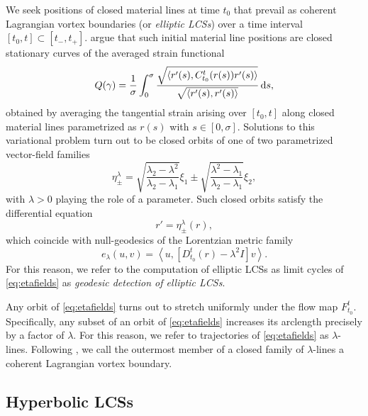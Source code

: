 \documentclass{article}
\begin{document}
We seek positions of closed material lines at time $t_0$ that prevail as coherent Lagrangian vortex boundaries (or \emph{elliptic LCSs}) over a time interval $[t_0,t]\subset[t_-,t_+]$. \textcite{haller13:_coher_lagran} argue that such initial material line positions are closed stationary curves of the averaged strain functional
\[
Q(\gamma) = \frac{1}{\sigma} \int_0^{\sigma} \frac{\sqrt{\langle r'(s),C_{t_0}^t(r(s))r'(s)\rangle}}{\sqrt{\langle r'(s),r'(s)\rangle}} \dif s,
\]
obtained by averaging the tangential strain arising over $[t_0,t]$ along closed material lines parametrized as $r(s)$ with $s \in [0,\sigma].$
Solutions to this variational problem turn out to be closed orbits of one of two parametrized vector-field families
\begin{equation}
\eta_\pm^\lambda = \sqrt{\frac{\lambda_2 - \lambda^2}{\lambda_2 - \lambda_1}} \xi_1 \pm \sqrt{\frac{\lambda^2 - \lambda_1}{\lambda_2 - \lambda_1}}\xi_2,
\label{eq:eta}
\end{equation}
with $\lambda > 0$ playing the role of a parameter. Such closed orbits satisfy the differential equation
\begin{equation}
r' = \eta_\pm^\lambda(r),
\label{eq:etafields}
\end{equation}
which coincide with null-geodesics of the Lorentzian metric family 
\[
e_\lambda(u,v) = \left\langle u,\left[D_{t_0}^t(r) - \lambda^2 I\right] v \right\rangle.
\]
For this reason, we refer to the computation of elliptic LCSs as limit cycles of \cref{eq:etafields} as \emph{geodesic detection of elliptic LCSs}.

Any orbit of \cref{eq:etafields} turns out to stretch uniformly under the flow map $F_{t_0}^t$. Specifically, any subset of an orbit of \cref{eq:etafields} increases its arclength precisely by a factor of $\lambda$. For this reason, we refer to trajectories of \cref{eq:etafields} as $\lambda$-lines. Following \textcite{haller13:_coher_lagran}, we call the outermost member of a closed family of $\lambda$-lines a coherent Lagrangian vortex boundary.

\subsection{Hyperbolic LCSs}
\label{sec:Hyperbolic LCSs}
\end{document}
